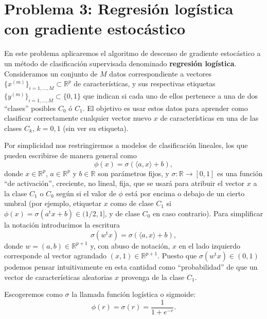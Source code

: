 \iffalse
\section*{Problema 3: Regresi\'on log\'istica con gradiente estocástico }

En este problema aplicaremos el algoritmo de descenso de gradiente estocástico a un m\'etodo de clasificación supervisada denominado {\bf regresi\'on log\'istica}.  Consideramos un conjunto de $M$ datos correspondiente a vectores   $\{x^{(m)}\}_{i=1,\dots,M} \subset \mathbb{R}^p$ de caracter\'isticas,  y  sus respectivas etiquetas  $\{y^{(m)}\}_{i=1,\dots,M} \subset \{0,1\}$ que indican si cada uno de ellos pertenece a  una de dos ``clases''  posibles $C_0$ ó $C_1$. El objetivo es usar estos datos para aprender como clasificar correctamente cualquier vector nuevo $x$ de caracter\'isticas  en una de las clases $C_k$, $k=0,1$ (sin ver su etiqueta).

Por simplicidad nos restringiremos a modelos de clasificación lineales, los que pueden escribirse de manera general como
\[  \phi(x)=\sigma\left( \langle a, x\rangle + b  \right), \]
donde  $x\in \mathbb{R}^p$, $a\in \mathbb{R}^p$  y $b\in \mathbb{R}$ son par\'ametros fijos,  y $\sigma: \mathbb{R}\to [0,1]$ es una función ``de activación'', creciente, no lineal, fija,  que se usar\'a para atribuir el vector $x$ a la clase $C_1$ o $C_0$ seg\'un si el valor de $\phi$ est\'a por encima o debajo de un cierto umbral (por ejemplo, etiquetar $x$ como de clase $C_1$ si $\phi(x)=\sigma   ( a^\mathrm{t}x + b) \in (1/2, 1]$, y de clase $C_0$ en caso contrario).  
 Para simplificar la notación introducimos la  escritura
\[  \sigma(w^\mathrm{t}x) =  \sigma\left( \langle a, x \rangle+ b  \right), \]
donde  $w = (a,b)\in \mathbb{R}^{p+1}$ y, con abuso de notaci\'on, $x$ en el lado izquierdo corresponde  al vector agrandado $ (x,1)\in\mathbb{R}^{p+1}$.  Puesto que $\sigma(w^\mathrm{t}x)\in (0,1)$ podemos pensar  intuitivamente en esta cantidad como  ``probabilidad'' de que un vector de caracter\'isticas aleatorias  $x$  provenga de la clase $C_1$.  

Escogeremos como $\sigma$ la llamada función logística o sigmoide: 
\[ \phi(r)=\sigma(r) = \frac{1}{1+e^{-r}}. \]


